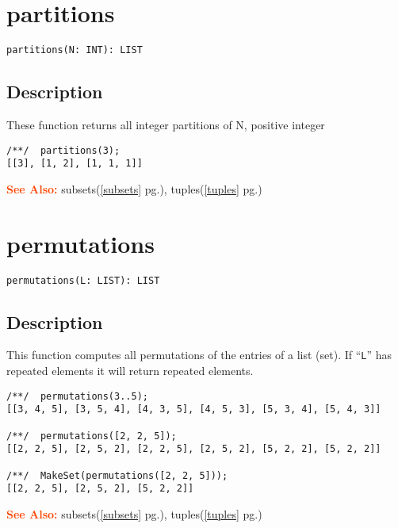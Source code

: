 \documentclass[a4paper]{mybook}
\newenvironment{command}{}{} %
\newcommand\SeeAlso{\par\textcolor{OrangeRed}{\textbf{\large See Also: }}}
\begin{document}
\section{partitions}
\label{partitions}
\begin{command} %


\begin{Verbatim}[label=syntax, rulecolor=\color{MidnightBlue},
frame=single]
partitions(N: INT): LIST
\end{Verbatim}


\subsection*{Description}

These function returns all integer partitions of N, positive integer
\begin{Verbatim}[label=example, rulecolor=\color{PineGreen}, frame=single]
/**/  partitions(3);
[[3], [1, 2], [1, 1, 1]]
\end{Verbatim}


\SeeAlso %
  subsets(\ref{subsets} pg.\pageref{subsets}), 
    tuples(\ref{tuples} pg.\pageref{tuples})
\end{command} %

\section{permutations}
\label{permutations}
\begin{command} %


\begin{Verbatim}[label=syntax, rulecolor=\color{MidnightBlue},
frame=single]
permutations(L: LIST): LIST
\end{Verbatim}


\subsection*{Description}

This function computes all permutations of the entries of a list (set).
If ``\verb&L&'' has repeated elements it will return repeated elements.
\begin{Verbatim}[label=example, rulecolor=\color{PineGreen}, frame=single]
/**/  permutations(3..5);
[[3, 4, 5], [3, 5, 4], [4, 3, 5], [4, 5, 3], [5, 3, 4], [5, 4, 3]]

/**/  permutations([2, 2, 5]);
[[2, 2, 5], [2, 5, 2], [2, 2, 5], [2, 5, 2], [5, 2, 2], [5, 2, 2]]

/**/  MakeSet(permutations([2, 2, 5]));
[[2, 2, 5], [2, 5, 2], [5, 2, 2]]
\end{Verbatim}


\SeeAlso %
  subsets(\ref{subsets} pg.\pageref{subsets}), 
    tuples(\ref{tuples} pg.\pageref{tuples})
\end{command} %
\end{document}
